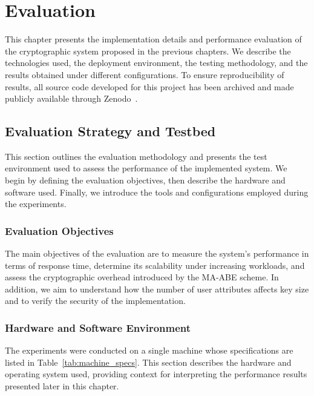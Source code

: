\documentclass[cic,tc,english]{iiufrgs}
\begin{document}
\chapter{Evaluation}
    \label{chap:evaluation}
    This chapter presents the implementation details and performance evaluation of the cryptographic system proposed in the previous chapters. We describe the technologies used, the deployment environment, the testing methodology, and the results obtained under different configurations. To ensure reproducibility of results, all source code developed for this project has been archived and made publicly available through Zenodo~\citep{maabeflask}.

    

    \section{Evaluation Strategy and Testbed}
        \label{sec:evaluation-setup}
        This section outlines the evaluation methodology and presents the test environment used to assess the performance of the implemented system. We begin by defining the evaluation objectives, then describe the hardware and software used. Finally, we introduce the tools and configurations employed during the experiments.

        \subsection{Evaluation Objectives}
        \label{subsec:evaluation-objectives}
            The main objectives of the evaluation are to measure the system's performance in terms of response time, determine its scalability under increasing workloads, and assess the cryptographic overhead introduced by the MA-ABE scheme. In addition, we aim to understand how the number of user attributes affects key size and to verify the security of the implementation.

        \subsection{Hardware and Software Environment}
        \label{subsec:hardware-software}
            The experiments were conducted on a single machine whose specifications are listed in Table~\ref{tab:machine_specs}. This section describes the hardware and operating system used, providing context for interpreting the performance results presented later in this chapter.
\end{document}
